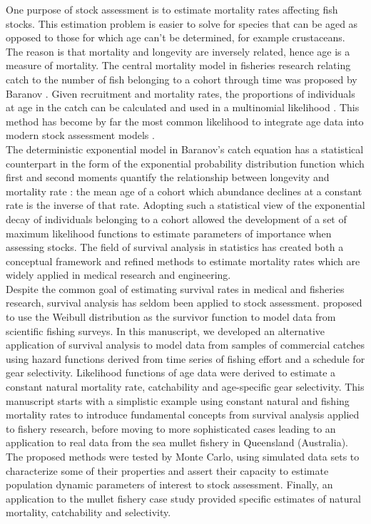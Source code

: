 One purpose of stock assessment is to estimate mortality rates affecting fish stocks. This estimation problem is easier to solve for species that can be aged as opposed to those for which age can't be determined, for example crustaceans. The reason is that mortality and longevity are inversely related, hence age is a measure of mortality. The central mortality model in fisheries research relating catch to the number of fish belonging to a cohort through time was proposed by Baranov \citep{quin99b}. Given recruitment and mortality rates, the proportions of individuals at age in the catch can be calculated and used in a multinomial likelihood  \citep{Four82a}. This method has become by far the most common likelihood to integrate age data into modern stock assessment models \citep{Francis201470, Maunder201361}.\\

The deterministic exponential model in Baranov's catch equation has a statistical counterpart in the form of the exponential probability distribution function which first and second moments quantify the relationship between longevity and mortality rate \citep{cow98b}: the mean age of a cohort which abundance declines at a constant rate is the inverse of that rate. Adopting such a statistical view of the exponential decay of individuals belonging to a cohort allowed the development of a set of maximum likelihood functions to estimate parameters of importance when assessing stocks. The field of survival analysis in statistics has created both a conceptual framework and refined methods to estimate mortality rates \citep{kleinbaum2005survival,cox84b} which are widely applied in medical research and engineering. \\ 

Despite the common goal of estimating survival rates in medical and fisheries research, survival analysis has seldom been applied to stock assessment. \cite{scimar42} proposed to use the Weibull distribution as the survivor function to model data from scientific fishing surveys. In this manuscript, we developed an alternative application of survival analysis to model data from samples of commercial catches using hazard functions derived from time series of fishing effort and a schedule for gear selectivity. Likelihood functions of age data were derived to estimate a constant natural mortality rate, catchability and age-specific gear selectivity. This manuscript starts with a simplistic example using constant natural and fishing mortality rates to introduce fundamental concepts from survival analysis applied to fishery research, before moving to more sophisticated cases leading to an application to real data from the sea mullet fishery in Queensland (Australia). The proposed methods were tested by Monte Carlo, using simulated data sets to characterize some of their properties and assert their capacity to estimate population dynamic parameters of interest to stock assessment. Finally, an application to the mullet fishery case study provided specific estimates of natural mortality, catchability and selectivity. \\
